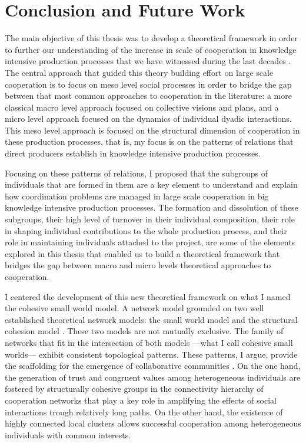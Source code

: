 \chapter{Conclusion and Future Work}
\label{conclusion}

The main objective of this thesis was to develop a theoretical framework in order to further our understanding of the increase in scale of cooperation in knowledge intensive production processes that we have witnessed during the last decades \citet*{uzzi:2007a}. The central approach that guided this theory building effort on large scale cooperation is to focus on meso level social processes in order to bridge the gap between that most common approaches to cooperation in the literature: a more classical macro level approach focused on collective visions and plans, and a micro level approach focused on the dynamics of individual dyadic interactions. This meso level approach is focused on the structural dimension of cooperation in these production processes, that is, my focus is on the patterns of relations that direct producers establish in knowledge intensive production processes.

Focusing on these patterns of relations, I proposed that the subgroups of individuals that are formed in them are a key element to understand and explain how coordination problems are managed in large scale cooperation in big knowledge intensive production processes. The formation and dissolution of these subgroups, their high level of turnover in their individual composition, their role in shaping individual contributions to the whole production process, and their role in maintaining individuals attached to the project, are some of the elements explored in this thesis that enabled us to build a theoretical framework that bridges the gap between macro and micro levels theoretical approaches to cooperation.

I centered the development of this new theoretical framework on what I named the cohesive small world model. A network model grounded on two well established theoretical network models: the small world model \citep{watts:1998} and the structural cohesion model \citep{white:2001, moody:2003}. These two models are not mutually exclusive. The family of networks that fit in the intersection of both models ---what I call cohesive small worlds--- exhibit consistent topological patterns. These patterns, I argue, provide the scaffolding for the emergence of collaborative communities \citep{adler: 2006}. On the one hand, the generation of trust and congruent values among heterogeneous individuals are fostered by structurally cohesive groups in the connectivity hierarchy of cooperation networks that play a key role in amplifying the effects of social interactions trough relatively long paths. On the other hand, the existence of highly connected local clusters allows successful cooperation among heterogeneous individuals with common interests.

